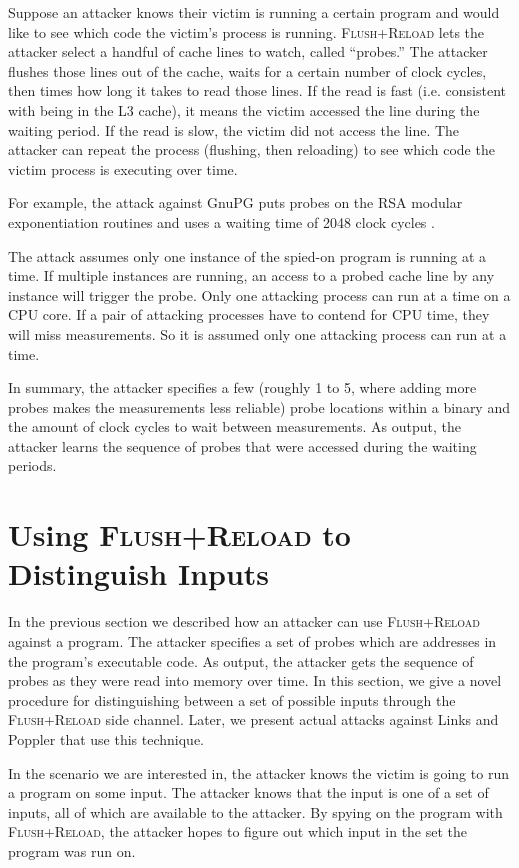 \documentclass[letterpaper,twocolumn,10pt]{article}
\begin{document}
Suppose an attacker knows their victim is running a certain program and would
like to see which code the victim's process is running. \textsc{Flush+Reload}
lets the attacker select a handful of cache lines to watch, called ``probes.''
The attacker flushes those lines out of the cache, waits for a certain number of
clock cycles, then times how long it takes to read those lines. If the read is
fast (i.e. consistent with being in the L3 cache), it means the victim accessed
the line during the waiting period. If the read is slow, the victim did not
access the line. The attacker can repeat the process (flushing, then reloading)
to see which code the victim process is executing over time.

For example, the attack against GnuPG puts probes on the RSA modular
exponentiation routines and uses a waiting time of 2048 clock cycles
\cite{yarom2013flush}.

The attack assumes only one instance of the spied-on program is running at
a time. If multiple instances are running, an access to a probed cache line by
any instance will trigger the probe. Only one attacking process can run at
a time on a CPU core. If a pair of attacking processes have to contend for CPU
time, they will miss measurements. So it is assumed only one attacking process
can run at a time.

In summary, the attacker specifies a few (roughly 1 to 5, where adding more
probes makes the measurements less reliable) probe locations within a binary and
the amount of clock cycles to wait between measurements. As output, the attacker
learns the sequence of probes that were accessed during the waiting periods.

\section{Using \textsc{Flush+Reload} to Distinguish Inputs}
\label{sec:distinguishing}

In the previous section we described how an attacker can use
\textsc{Flush+Reload} against a program. The attacker specifies a set of probes
which are addresses in the program's executable code. As output, the attacker
gets the sequence of probes as they were read into memory over time. In this
section, we give a novel procedure for distinguishing between a set of possible
inputs through the \textsc{Flush+Reload} side channel. Later, we present actual
attacks against Links and Poppler that use this technique.

In the scenario we are interested in, the attacker knows the victim is going to
run a program on some input. The attacker knows that the input is one of a set
of inputs, all of which are available to the attacker. By spying on the program
with \textsc{Flush+Reload}, the attacker hopes to figure out which input in the
set the program was run on.
\end{document}
